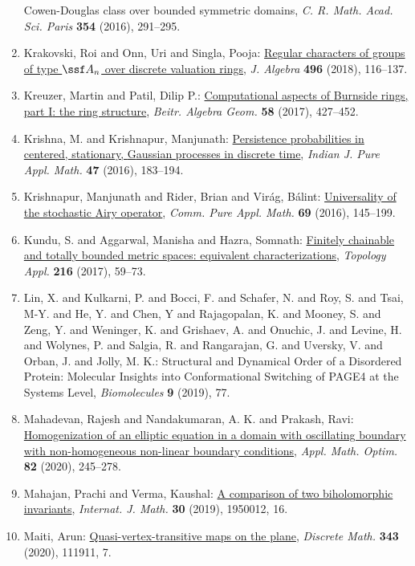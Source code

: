 \begin{enumerate}
{{C}owen-{D}ouglas class over bounded symmetric domains}, \emph{C. R. Math. Acad. Sci. Paris} {\bf 354} (2016), 291--295.
\item Krakovski, Roi and Onn, Uri and Singla, Pooja: \href{https://doi.org/10.1016/j.jalgebra.2017.10.018}{Regular characters of groups of type {$\ssf A_n$} over
discrete valuation rings}, \emph{J. Algebra} {\bf 496} (2018), 116--137.
\item Kreuzer, Martin and Patil, Dilip P.: \href{https://doi.org/10.1007/s13366-016-0324-4}{Computational aspects of {B}urnside rings, part {I}: the ring
structure}, \emph{Beitr. Algebra Geom.} {\bf 58} (2017), 427--452.
\item Krishna, M. and Krishnapur, Manjunath: \href{https://doi.org/10.1007/s13226-016-0183-6}{Persistence probabilities in centered, stationary, {G}aussian
processes in discrete time}, \emph{Indian J. Pure Appl. Math.} {\bf 47} (2016), 183--194.
\item Krishnapur, Manjunath and Rider, Brian and Vir\'{a}g, B\'{a}lint: \href{https://doi.org/10.1002/cpa.21573}{Universality of the stochastic {A}iry operator}, \emph{Comm. Pure Appl. Math.} {\bf 69} (2016), 145--199.
\item Kundu, S. and Aggarwal, Manisha and Hazra, Somnath: \href{https://doi.org/10.1016/j.topol.2016.11.008}{Finitely chainable and totally bounded metric spaces:
equivalent characterizations}, \emph{Topology Appl.} {\bf 216} (2017), 59--73.
\item Lin, X. and Kulkarni, P. and Bocci, F. and Schafer, N. and Roy, S. and Tsai, M-Y. and He, Y. and Chen, Y and Rajagopalan, K. and Mooney, S. and Zeng, Y. and Weninger, K. and Grishaev, A. and Onuchic, J. and Levine, H. and Wolynes, P. and Salgia, R. and Rangarajan, G. and Uversky, V. and Orban, J. and Jolly, M. K.: Structural and Dynamical Order of a Disordered Protein: Molecular Insights into Conformational Switching of PAGE4 at the Systems Level, \emph{Biomolecules} {\bf 9} (2019), 77.
\item Mahadevan, Rajesh and Nandakumaran, A. K. and Prakash, Ravi: \href{https://doi.org/10.1007/s00245-018-9499-4}{Homogenization of an elliptic equation in a domain with
oscillating boundary with non-homogeneous non-linear boundary
conditions}, \emph{Appl. Math. Optim.} {\bf 82} (2020), 245--278.
\item Mahajan, Prachi and Verma, Kaushal: \href{https://doi.org/10.1142/S0129167X19500125}{A comparison of two biholomorphic invariants}, \emph{Internat. J. Math.} {\bf 30} (2019), 1950012, 16.
\item Maiti, Arun: \href{https://doi.org/10.1016/j.disc.2020.111911}{Quasi-vertex-transitive maps on the plane}, \emph{Discrete Math.} {\bf 343} (2020), 111911, 7.

\end{enumerate}
